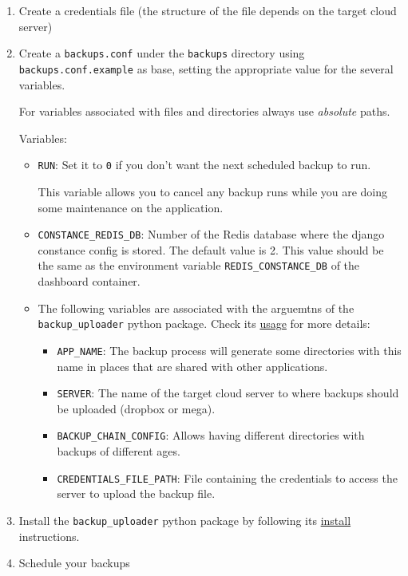 \documentclass[
]{book}
\begin{document}
\begin{enumerate}
\def\labelenumi{\arabic{enumi}.}
\item
  Create a credentials file (the structure of the file depends on the target cloud server)
\item
  Create a \texttt{backups.conf} under the \texttt{backups} directory using \texttt{backups.conf.example} as base, setting the appropriate value for the several variables.

  For variables associated with files and directories always use \emph{absolute} paths.

  Variables:

  \begin{itemize}
  \item
    \texttt{RUN}: Set it to \texttt{0} if you don't want the next scheduled backup to run.

    This variable allows you to cancel any backup runs while you are doing some maintenance on the application.
  \item
    \texttt{CONSTANCE\_REDIS\_DB}: Number of the Redis database where the django constance config is stored. The default value is 2. This value should be the same as the environment variable \texttt{REDIS\_CONSTANCE\_DB} of the dashboard container.
  \item
    The following variables are associated with the arguemtns of the \texttt{backup\_uploader} python package. Check its \href{https://github.com/aspedrosa/BackupUploader\#usage}{usage} for more details:

    \begin{itemize}
    \item
      \texttt{APP\_NAME}: The backup process will generate some directories with this name in places that are shared with other applications.
    \item
      \texttt{SERVER}: The name of the target cloud server to where backups should be uploaded (dropbox or mega).
    \item
      \texttt{BACKUP\_CHAIN\_CONFIG}: Allows having different directories with backups of different ages.
    \item
      \texttt{CREDENTIALS\_FILE\_PATH}: File containing the credentials to access the server to upload the backup file.
    \end{itemize}
  \end{itemize}
\item
  Install the \texttt{backup\_uploader} python package by following its \href{https://github.com/aspedrosa/BackupUploader\#install}{install} instructions.
\item
  Schedule your backups


\end{enumerate}
\end{document}
